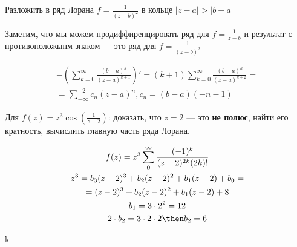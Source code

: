 \begin{exmpl}
    Разложить в ряд Лорана $f = \frac{1}{(z - b)^2}$ в кольце $|z - a| > |b - a|$
\end{exmpl}
\begin{sol}
    Заметим, что мы можем продиффиренцировать ряд для $f = \frac{1}{z - b}$ и результат с противоположынм знаком --- это ряд для $f = \frac{1}{(z - b)^2}$

    \begin{gather*}
        - \left( \sum\limits_{k = 0}^{\infty} \frac{(b - a)^k}{(z - a)^{k + 1}} \right)' = (k + 1)\sum\limits_{k = 0}^{\infty} \frac{(b - a)^k}{(z - a)^{k + 2}} = \\ 
        = \sum\limits_{-\infty}^{-2}c_n(z - a)^n, c_n = (b - a)(-n - 1)
    \end{gather*}
\end{sol}

\begin{exmpl}
    Для $f(z) = z^3 \cos \left( \frac{1}{z - 2} \right)$: доказать, что $z = 2$ --- это \textbf{не полюс}, найти его кратность, вычислить главную часть ряда Лорана.
\end{exmpl}
\begin{sol}
    \begin{gather*}
        f(z) = z^3 \sum\limits_0^{\infty}\frac{(-1)^k}{(z - 2)^{2k} (2k)!}\\ 
        z^3 = b_3(z - 2)^3 + b_2(z - 2)^2 + b_1(z - 2) + b_0 = \\
        = (z -2)^3 + b_2(z - 2)^2 + b_1(z - 2) + 8 \\
        b_1 = 3 \cdot 2^2 = 12 \\ 
        2\cdot b_2 = 3 \cdot 2 \cdot 2 \then b_2 = 6
    \end{gather*}
\end{sol}k